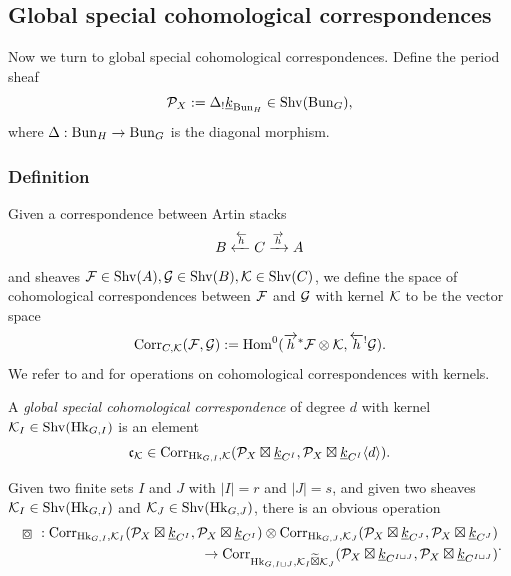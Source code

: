 \documentclass[reqno]{amsart}
\numberwithin{equation}{section}
\numberwithin{equation}{section}
\begin{document}
\subsection{Global special cohomological correspondences}
Now we turn to global special cohomological correspondences. 
Define the period sheaf
\begin{equation}\label{eq:periodsheaf}
\mathcal{P}_X:=\Delta_!\underline{k}_{\operatorname{Bun}_H}\in \mathrm{Shv}(\operatorname{Bun}_G),
\end{equation}
where $\Delta:\operatorname{Bun}_H\to \operatorname{Bun}_G$ is the diagonal morphism.

\subsubsection{Definition}
Given a correspondence between Artin stacks \[B \xleftarrow{\overleftarrow{h}} C \xrightarrow{\overrightarrow{h}} A\] and sheaves $\mathcal{F}\in\mathrm{Shv}(A), \mathcal{G}\in \mathrm{Shv}(B), \mathcal{K}\in \mathrm{Shv}(C)$, we define the space of cohomological correspondences between $\mathcal{F}$ and $\mathcal{G}$ with kernel $\mathcal{K}$ to be the vector space \[\mathrm{Corr}_{C,\mathcal{K}}(\mathcal{F},\mathcal{G}):=\operatorname{Hom}^0(\overrightarrow{h}^*\mathcal{F} \otimes \mathcal{K},\overleftarrow{h}^!\mathcal{G}).\] We refer to \cite[\S4.2]{liu2025higherperiodintegralsderivatives} and \cite[\S2.2]{wang2026arithmeticvolumeshtukaslanglands} for operations on cohomological correspondences with kernels.



A \emph{global special cohomological correspondence} of degree $d$ with kernel $\mathcal{K}_I\in \mathrm{Shv}(\operatorname{Hk}_{G,I})$ is an element \[\mathfrak{c}_{\mathcal{K}} \in \mathrm{Corr}_{\operatorname{Hk}_{G,I},\mathcal{K}}(\mathcal{P}_X\boxtimes\underline{k}_{C^I},\mathcal{P}_X\boxtimes\underline{k}_{C^I}\langle d\rangle).\]

Given two finite sets $I$ and $J$ with $|I|=r$ and $|J|=s$, and given two sheaves $\mathcal{K}_I\in \mathrm{Shv}(\operatorname{Hk}_{G,I})$ and $\mathcal{K}_J\in \mathrm{Shv}(\operatorname{Hk}_{G,J})$, there is an obvious operation 
\begin{equation} \begin{split}
    \boxcirc:\Cor_{\Hk_{G,I},\cK_I}(\cP_X\boxtimes\uk_{C^I},\cP_X\boxtimes\uk_{C^I})\otimes \Cor_{\Hk_{G,J},\cK_J}(\cP_X\boxtimes\uk_{C^J},\cP_X\boxtimes\uk_{C^J}) \\ \to \Cor_{\Hk_{G,I\sqcup J},\cK_I\widetilde{\boxtimes} \cK_J}(\cP_X\boxtimes\uk_{C^{I\sqcup J}},\cP_X\boxtimes \uk_{C^{I\sqcup J}})
\end{split}.\end{equation}
\end{document}
